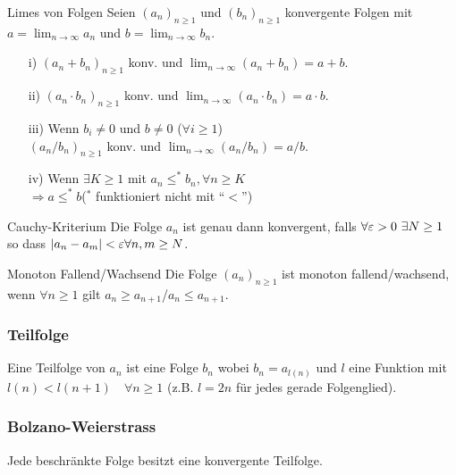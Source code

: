 \documentclass[a4paper,10pt]{article}
\begin{document}
\begin{subbox}{Limes von Folgen}
	Seien $(a_n)_{n\geq 1}$ und 	$(b_n)_{n\geq 1}$ konvergente Folgen mit $a=\lim_{n\rightarrow\infty} a_n$ und $b=\lim_{n\rightarrow\infty} b_n$.
	\begin{itemize}[leftmargin=18pt]
		\item[i)] $(a_n+b_n)_{n\geq 1}$ konv. und $\lim_{n\rightarrow\infty} (a_n+b_n)= a+b$.
		\item[ii)] $(a_n\cdot b_n)_{n\geq 1}$ konv. und $\lim_{n\rightarrow\infty} (a_n\cdot b_n)= a \cdot b$.
		\item[iii)] Wenn $b_i \neq 0$ und $b \neq 0$ \hfill($\forall i\geq 1$)
		      \\$(a_n / b_n)_{n\geq 1}$ konv. und $\lim_{n\rightarrow\infty} (a_n / b_n)= a / b$.
		\item[iv)] Wenn $\exists K \geq 1$ mit $a_n \leq^* b_n, \forall n\geq K$\\
		      $\Rightarrow a \leq^* b$\hfill ($^*$ funktioniert nicht mit ``$<$'')
	\end{itemize}
\end{subbox}


\begin{mainbox}{Cauchy-Kriterium}
	Die Folge $a_n$ ist genau dann konvergent, falls $\\\forall \varepsilon > 0 \ \exists N \ge 1$ so dass $| a_n - a_m | < \varepsilon \hfill \forall n,m \ge N$.
\end{mainbox}

\begin{subbox}{Monoton Fallend/Wachsend}
	Die Folge $(a_n)_{n\geq 1}$	ist monoton fallend/wachsend, wenn $\forall n\geq 1$ gilt $a_n \geq a_{n+1}$/$a_n \leq a_{n+1}$.
\end{subbox}


\subsubsection{Teilfolge}
Eine Teilfolge von $a_n$ ist eine Folge $b_n$ wobei $b_n = a_{l(n)}$ und $l$ eine Funktion mit $l(n) < l(n+1) \quad \forall n \ge 1$ (z.B. $l = 2n$ für jedes gerade Folgenglied). 

\subsubsection{Bolzano-Weierstrass}
Jede beschränkte Folge besitzt eine konvergente Teilfolge.
\end{document}

